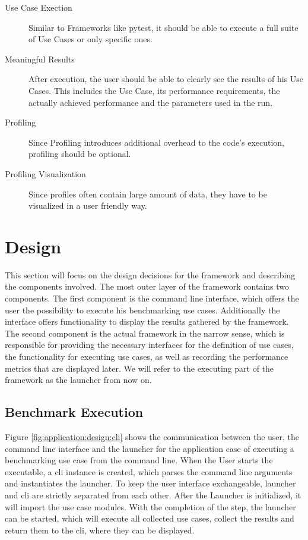 \begin{description}
    \item[Use Case Exection]
        Similar to Frameworks like pytest, it should be able to execute a full
        suite of Use Cases or only specific ones.
    \item[Meaningful Results]
        After execution, the user should be able to clearly see the results of
        his Use Cases. This includes the Use Case, its performance requirements,
        the actually achieved performance and the parameters used in the run.
    \item[Profiling]
        Since Profiling introduces additional overhead to the code's execution,
        profiling should be optional.
    \item[Profiling Visualization]
        Since profiles often contain large amount of data, they have to be
        visualized in a user friendly way.
\end{description}





\section{Design}

\label{sec:application:design}

This section will focus on the design decisions for the framework and describing
the components involved. The most outer layer of the framework contains two
components. The first component is the command line interface, which offers the
user the possibility to execute his benchmarking use cases. Additionally the
interface offers functionality to display the results gathered by the framework.
The second component is the actual framework in the narrow sense, which is
responsible for providing the necessary interfaces for the definition of use
cases, the functionality for executing use cases, as well as recording the
performance metrics that are displayed later. We will refer to the executing
part of the framework as the launcher from now on.

\subsection{Benchmark Execution}

Figure \ref{fig:application:design:cli} shows the communication between the
user, the command line interface and the launcher for the application case of
executing a benchmarking use case from the command line.  When the User starts
the executable, a \gls{cli} instance is created, which parses the command line
arguments and instantiates the launcher. To keep the user interface
exchangeable, launcher and \gls{cli} are strictly separated from each other.
After the Launcher is initialized, it will import the use case modules. With the
completion of the step, the launcher can be started, which will execute all
collected use cases, collect the results and return them to the \gls{cli}, where
they can be displayed.

